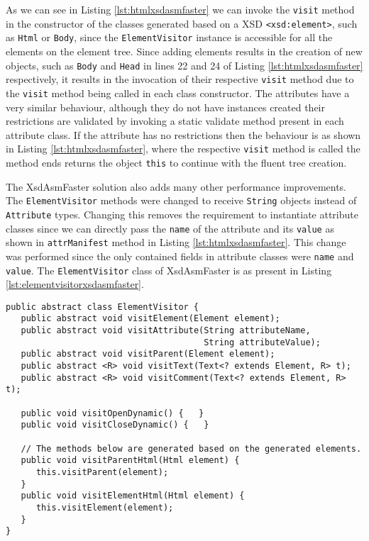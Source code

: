 \noindent
As we can see in Listing \ref{lst:htmlxsdasmfaster} we can invoke the \texttt{visit} method in the constructor of the classes generated based on a \ac{XSD} \texttt{<xsd:element>}, such as \texttt{Html} or \texttt{Body}, since the \texttt{ElementVisitor} instance is accessible for all the elements on the element tree. Since adding elements results in the creation of new objects, such as \texttt{Body} and \texttt{Head} in lines 22 and 24 of Listing \ref{lst:htmlxsdasmfaster} respectively, it results in the invocation of their respective \texttt{visit} method due to the \texttt{visit} method being called in each class constructor. The attributes have a very similar behaviour, although they do not have instances created their restrictions are validated by invoking a static validate method present in each attribute class. If the attribute has no restrictions then the behaviour is as shown in Listing \ref{lst:htmlxsdasmfaster}, where the respective \texttt{visit} method is called the method ends returns the object \texttt{this} to continue with the fluent tree creation.

\noindent
The XsdAsmFaster solution also adds many other performance improvements. The \texttt{ElementVisitor} methods were changed to receive \texttt{String} objects instead of \texttt{Attribute} types. Changing this removes the requirement to instantiate attribute classes since we can directly pass the \texttt{name} of the attribute and its \texttt{value} as shown in \texttt{attrManifest} method in Listing \ref{lst:htmlxsdasmfaster}. This change was performed since the only contained fields in attribute classes were \texttt{name} and \texttt{value}. The \texttt{ElementVisitor} class of XsdAsmFaster is as present in Listing \ref{lst:elementvisitorxsdasmfaster}.

\bigskip


\begin{minipage}{\linewidth}
\begin{lstlisting}[caption={ElementVisitor Generated by XsdAsmFaster},label={lst:elementvisitorxsdasmfaster}]
public abstract class ElementVisitor {
   public abstract void visitElement(Element element);
   public abstract void visitAttribute(String attributeName, 
                                       String attributeValue);
   public abstract void visitParent(Element element);
   public abstract <R> void visitText(Text<? extends Element, R> t);
   public abstract <R> void visitComment(Text<? extends Element, R> t);

   public void visitOpenDynamic() {   }
   public void visitCloseDynamic() {   }

   // The methods below are generated based on the generated elements.
   public void visitParentHtml(Html element) {
      this.visitParent(element);
   }
   public void visitElementHtml(Html element) {
      this.visitElement(element);
   }
}
\end{lstlisting}
\end{minipage}

